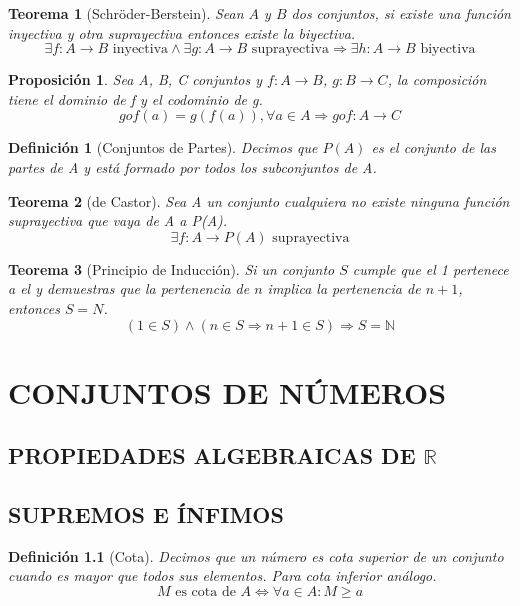 \documentclass[10pt,a4paper,openright]{book}
\newtheorem{teorema}{Teorema}[chapter]
\newtheorem{proposicion}{Proposición}[chapter]
\newtheorem{definicion}{Definición}[chapter]
\begin{document}
\begin{teorema}[Schröder-Berstein]
Sean $A$ y $B$ dos conjuntos, si existe una función inyectiva y otra suprayectiva entonces existe la biyectiva.
$$\exists f: A\rightarrow B \mbox{ inyectiva}\wedge \exists g: A\rightarrow B \mbox{ suprayectiva}\Rightarrow \exists h: A\rightarrow B \mbox{ biyectiva}$$
\end{teorema}

\begin{proposicion}
Sea A, B, C conjuntos y $f: A\rightarrow B$, $g: B\rightarrow C$, la composición tiene el dominio de f y el codominio de g.
$$gof(a)=g\left(f(a)\right),\forall a \in A\Rightarrow gof: A\rightarrow C$$
\end{proposicion}

\begin{definicion}[Conjuntos de Partes]
Decimos que $P(A)$ es el conjunto de las partes de A y está formado por todos los subconjuntos de A.
\end{definicion}

\begin{teorema}[de Castor]
Sea A un conjunto cualquiera no existe ninguna función suprayectiva que vaya de A a P(A).
$$\exists f: A \longrightarrow P(A) \mbox{ suprayectiva}$$
\end{teorema}

\begin{teorema}[Principio de Inducción]
Si un conjunto $S$ cumple que el 1 pertenece a el y demuestras que la pertenencia de $n$ implica la pertenencia de $n+1$, entonces $S=N$.
$$(1\in S) \wedge (n\in S\Rightarrow n+1\in S)\Rightarrow S=\mathbb N$$
\end{teorema}

\chapter{CONJUNTOS DE NÚMEROS}
\section{PROPIEDADES ALGEBRAICAS DE $\mathbb R$}
\section{SUPREMOS E ÍNFIMOS}

\begin{definicion}[Cota]
Decimos que un número es cota superior de un conjunto cuando es mayor que todos sus elementos. Para cota inferior análogo.
$$M\mbox{ es cota de }A\Leftrightarrow \forall a\in A: M\geq a$$
\end{definicion}
\end{document}
